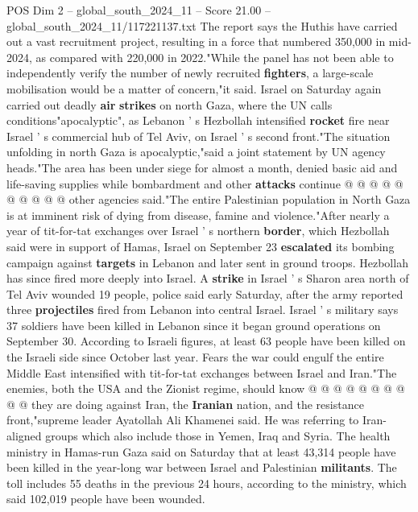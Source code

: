 \begin{textsample}{POS Dim 2 – global\_south\_2024\_11 – Score 21.00 – global\_south\_2024\_11/117221137.txt}
The report says the Huthis have carried out a vast recruitment project, resulting in a force that numbered 350,000 in mid-2024, as compared with 220,000 in 2022."While the panel has not been able to independently verify the number of newly recruited \textbf{fighters}, a large-scale mobilisation would be a matter of concern,"it said.
Israel on Saturday again carried out deadly \textbf{air} \textbf{strikes} on north Gaza, where the UN calls conditions"apocalyptic", as Lebanon ' s Hezbollah intensified \textbf{rocket} fire near Israel ' s commercial hub of Tel Aviv, on Israel ' s second front."The situation unfolding in north Gaza is apocalyptic,"said a joint statement by UN agency heads."The area has been under siege for almost a month, denied basic aid and life-saving supplies while bombardment and other \textbf{attacks} continue @ @ @ @ @ @ @ @ @ @ other agencies said."The entire Palestinian population in North Gaza is at imminent risk of dying from disease, famine and violence."After nearly a year of tit-for-tat exchanges over Israel ' s northern \textbf{border}, which Hezbollah said were in support of Hamas, Israel on September 23 \textbf{escalated} its bombing campaign against \textbf{targets} in Lebanon and later sent in ground troops.
Hezbollah has since fired more deeply into Israel.
A \textbf{strike} in Israel ' s Sharon area north of Tel Aviv wounded 19 people, police said early Saturday, after the army reported three \textbf{projectiles} fired from Lebanon into central Israel.
Israel ' s military says 37 soldiers have been killed in Lebanon since it began ground operations on September 30.
According to Israeli figures, at least 63 people have been killed on the Israeli side since October last year.
Fears the war could engulf the entire Middle East intensified with tit-for-tat exchanges between Israel and Iran."The enemies, both the USA and the Zionist regime, should know @ @ @ @ @ @ @ @ @ @ they are doing against Iran, the \textbf{Iranian} nation, and the resistance front,"supreme leader Ayatollah Ali Khamenei said.
He was referring to Iran-aligned groups which also include those in Yemen, Iraq and Syria.
The health ministry in Hamas-run Gaza said on Saturday that at least 43,314 people have been killed in the year-long war between Israel and Palestinian \textbf{militants}.
The toll includes 55 deaths in the previous 24 hours, according to the ministry, which said 102,019 people have been wounded.

\end{textsample}
